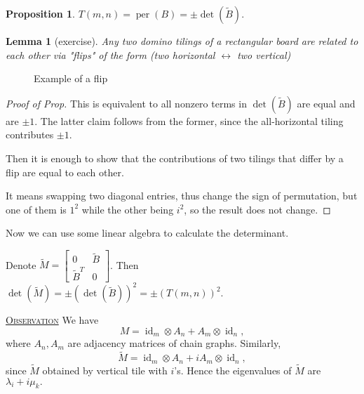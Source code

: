 \documentclass{report}
\def \id {\operatorname{id}}
\def \per {\operatorname{per}}
\newcommand{\fancyem}[1]{\underline{\textsc{#1}}}
\newtheorem{lemma}{Lemma}[section]
\newtheorem{proposition}{Proposition}[section]
\theoremstyle{definition}
\theoremstyle{remark}
\numberwithin{equation}{section}
\begin{document}
\begin{proposition}
$T(m, n) = \per(B) = \pm \det(\tilde{B}).$
\end{proposition}
\begin{lemma}[exercise]
Any two domino tilings of a rectangular board are related to each other via "flips" of the form (two horizontal $\leftrightarrow$ two vertical)
\end{lemma}

\begin{figure}[h]
\centering
{}
\caption{Example of a flip}
\end{figure}

\begin{proof}[Proof of Prop]
This is equivalent to all nonzero terms in $\det(\tilde{B})$ are equal and are $\pm 1.$ The latter claim follows from the former, since the all-horizontal tiling contributes $\pm 1$.

Then it is enough to show that the contributions of two tilings that differ by a flip are equal to each other.

It means swapping two diagonal entries, thus change the sign of permutation, but one of them is $1^2$ while the other being $i^2$, so the result does not change.
\end{proof}

Now we can use some linear algebra to calculate the determinant.

Denote $\tilde{M} = \begin{bmatrix}
0 & \tilde{B} \\
\tilde{B}^T & 0
\end{bmatrix}$. Then $\det(\tilde{M}) = \pm (\det(\tilde{B}))^2 = \pm (T(m, n))^2.$

\fancyem{Observation} We have \[M = \id_m \otimes A_n + A_m \otimes \id_n,\] where $A_n, A_m$ are adjacency matrices of chain graphs. Similarly,
\[
\tilde{M} = \id_m \otimes A_n + iA_m \otimes \id_n,
\]
since $\tilde{M}$ obtained by vertical tile with $i$'s. Hence the eigenvalues of $\tilde{M}$ are $\lambda_i + i\mu_k.$
\end{document}
